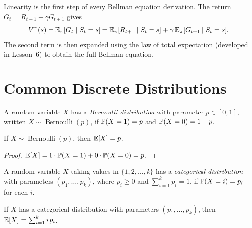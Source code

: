\documentclass[11pt,a4paper]{article}
\begin{document}
\begin{rlconnection}[title={Connection to RL}]
Linearity is the first step of every Bellman equation derivation. The
return $G_t = R_{t+1} + \gamma G_{t+1}$ gives
\[
  V^\pi(s) = \mathbb{E}_\pi[G_t \mid S_t = s]
  = \mathbb{E}_\pi[R_{t+1} \mid S_t = s]
    + \gamma\, \mathbb{E}_\pi[G_{t+1} \mid S_t = s].
\]
The second term is then expanded using the law of total expectation
(developed in Lesson~6) to obtain the full Bellman equation.
\end{rlconnection}


\section{Common Discrete Distributions}
\label{sec:distributions}

\begin{definition}
\label{def:bernoulli}
A random variable $X$ has a \emph{Bernoulli distribution} with parameter
$p \in [0,1]$, written $X \sim \operatorname{Bernoulli}(p)$, if
$\mathbb{P}(X = 1) = p$ and $\mathbb{P}(X = 0) = 1 - p$.
\end{definition}

\begin{proposition}
\label{prop:bernoulli_E}
If $X \sim \operatorname{Bernoulli}(p)$, then $\mathbb{E}[X] = p$.
\end{proposition}

\begin{proof}
$\mathbb{E}[X] = 1 \cdot \mathbb{P}(X = 1) + 0 \cdot \mathbb{P}(X = 0) = p$.
\end{proof}

\begin{definition}
\label{def:categorical}
A random variable $X$ taking values in $\{1, 2, \ldots, k\}$ has a
\emph{categorical distribution} with parameters $(p_1, \ldots, p_k)$,
where $p_i \geq 0$ and $\sum_{i=1}^k p_i = 1$, if
$\mathbb{P}(X = i) = p_i$ for each $i$.
\end{definition}

\begin{proposition}
\label{prop:categorical_E}
If $X$ has a categorical distribution with parameters $(p_1, \ldots, p_k)$,
then $\mathbb{E}[X] = \sum_{i=1}^k i\, p_i$.
\end{proposition}
\end{document}
